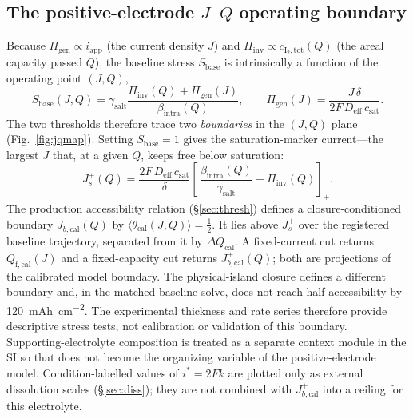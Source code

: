 \documentclass[11pt]{article}
\newcommand{\csat}{c_{\mathrm{sat}}}
\newcommand{\iapp}{i_{\mathrm{app}}}
\newcommand{\Deff}{D_{\mathrm{eff}}}
\newcommand{\thetacal}{\theta_{\mathrm{cal}}}
\newcommand{\Qfcal}{Q_{\mathrm{f,cal}}}
\begin{document}
\subsection{The positive-electrode \texorpdfstring{$J$--$Q$}{J-Q} operating boundary}
\label{sec:jq}
Because $\Pi_{\mathrm{gen}}\!\propto\!\iapp$ (the current density $J$) and
$\Pi_{\mathrm{inv}}\!\propto\!c_{\mathrm{I_2,tot}}(Q)$ (the areal capacity passed $Q$),
the baseline stress $S_{\mathrm{base}}$ is intrinsically a function of the operating point $(J,Q)$,
\begin{equation}
S_{\mathrm{base}}(J,Q)=
\gamma_{\mathrm{salt}}
\frac{\Pi_{\mathrm{inv}}(Q)+\Pi_{\mathrm{gen}}(J)}{\beta_{\mathrm{intra}}(Q)},
\qquad
\Pi_{\mathrm{gen}}(J)=\frac{J\,\delta}{2F\,\Deff\,\csat}.
\label{eq:seffjq}
\end{equation}
The two thresholds therefore trace two \emph{boundaries} in the $(J,Q)$ plane (Fig.~\ref{fig:jqmap}).
Setting $S_{\mathrm{base}}=1$ gives the saturation-marker current---the largest $J$ that, at a given $Q$,
keeps free  below saturation:
\begin{equation}
\boxed{\;J_s^{+}(Q)=\frac{2F\,\Deff\,\csat}{\delta}
\left[\,\frac{\beta_{\mathrm{intra}}(Q)}{\gamma_{\mathrm{salt}}}
-\Pi_{\mathrm{inv}}(Q)\right]_{+}.\;}
\label{eq:jsplus}
\end{equation}
The production accessibility relation (\S\ref{sec:thresh}) defines a closure-conditioned boundary
$J_{b,\mathrm{cal}}^{+}(Q)$ by
$\langle\thetacal(J,Q)\rangle=\tfrac12$. It lies above $J_s^{+}$ over the registered baseline trajectory,
separated from it by $\Delta Q_{\mathrm{cal}}$. A fixed-current cut returns $\Qfcal(J)$ and a fixed-capacity cut returns
$J_{b,\mathrm{cal}}^{+}(Q)$; both are projections of the calibrated model boundary. The physical-island
closure defines a different boundary and, in the matched baseline solve, does not reach half accessibility by
\SI{120}{mAh.cm^{-2}}. The experimental thickness and rate series therefore provide descriptive stress tests,
not calibration or validation of this boundary. Supporting-electrolyte composition is treated as a separate
context module in the SI so that  does not become the organizing variable of the positive-electrode
model. Condition-labelled values of $i^{*}=2Fk$ are plotted only as external dissolution scales
(\S\ref{sec:diss}); they are not combined with $J_{b,\mathrm{cal}}^{+}$ into a ceiling for this electrolyte.
\end{document}
